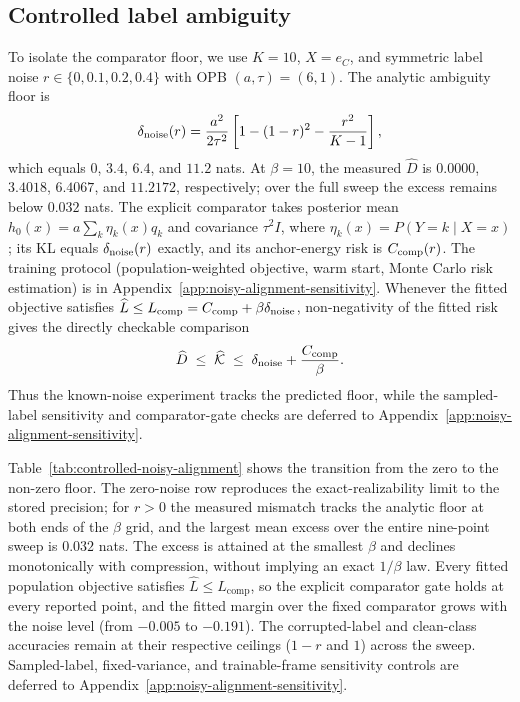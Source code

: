 \subsection{Controlled label ambiguity}
\label{sec:controlled-validation}
To isolate the comparator floor, we use $K=10$, $X=e_C$, and symmetric label noise
$r\in\{0,0.1,0.2,0.4\}$ with OPB $(a,\tau)=(6,1)$. The analytic ambiguity floor is
\begin{equation}
\delta_{\rm noise}(r)=\frac{a^2}{2\tau^2}
\left[1-(1-r)^2-\frac{r^2}{K-1}\right],
\label{eq:synthetic-noise-floor}
\end{equation}
which equals $0$, $3.4$, $6.4$, and $11.2$ nats. At $\beta=10$, the measured
$\widehat D$ is $0.0000$, $3.4018$, $6.4067$, and $11.2172$, respectively; over the
full sweep the excess remains below $0.032$ nats. The explicit comparator takes
posterior mean $h_0(x)=a\sum_k\eta_k(x)q_k$ and covariance $\tau^2I$, where
$\eta_k(x)=P(Y=k\mid X=x)$; its KL equals $\delta_{\rm noise}(r)$ exactly, and its
anchor-energy risk is $C_{\rm comp}(r)$. The training protocol (population-weighted
objective, warm start, Monte Carlo risk estimation) is in
Appendix~\ref{app:noisy-alignment-sensitivity}. Whenever the
fitted objective satisfies $\widehat L\le L_{\rm comp}=C_{\rm comp}+\beta\delta_{\rm noise}$,
non-negativity of the fitted risk gives the directly checkable comparison
\begin{equation}
\widehat D\;\le\;\widehat{\mathcal K}
\;\le\;\delta_{\rm noise}+\frac{C_{\rm comp}}{\beta}.
\label{eq:synthetic-comparator-check}
\end{equation}
Thus the known-noise experiment tracks the predicted floor, while the sampled-label
sensitivity and comparator-gate checks are deferred to
Appendix~\ref{app:noisy-alignment-sensitivity}.



Table~\ref{tab:controlled-noisy-alignment} shows the transition from the zero to the
non-zero floor. The zero-noise row reproduces the exact-realizability limit to the
stored precision; for $r>0$ the measured mismatch tracks the analytic floor at both
ends of the $\beta$ grid, and the largest mean excess over the entire nine-point
sweep is $0.032$ nats. The excess is attained at the smallest $\beta$ and declines
monotonically with compression, without implying an exact $1/\beta$ law. Every fitted
population objective satisfies $\widehat L\le L_{\mathrm{comp}}$, so the explicit
comparator gate holds at every reported point, and the fitted margin over the fixed
comparator grows with the noise level (from $-0.005$ to $-0.191$). The corrupted-label
and clean-class accuracies remain at their respective ceilings ($1-r$ and $1$) across
the sweep. Sampled-label, fixed-variance, and trainable-frame sensitivity controls are
deferred to Appendix~\ref{app:noisy-alignment-sensitivity}.

